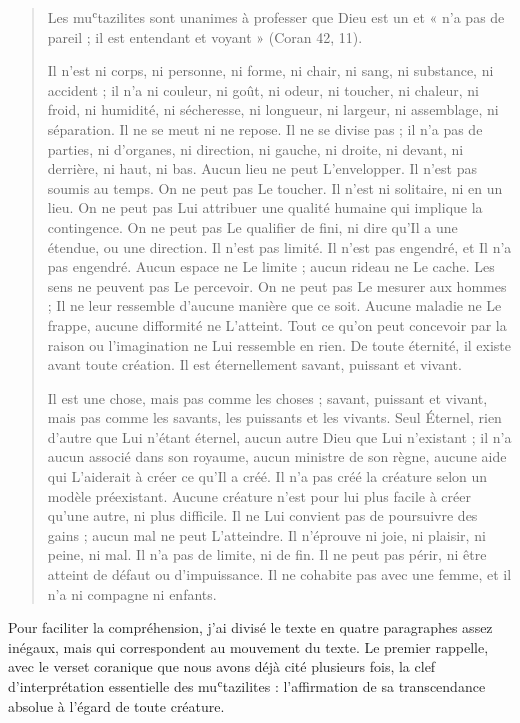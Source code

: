  \begin{quote}
     Les muʿtazilites sont unanimes à professer que Dieu est un et « n'a pas
de pareil ; il est entendant et voyant » (Coran 42, 11).

Il n'est ni corps, ni personne, ni forme, ni chair, ni sang, ni
substance, ni accident ; il n'a ni couleur, ni goût, ni odeur, ni
toucher, ni chaleur, ni froid, ni humidité, ni sécheresse, ni longueur,
ni largeur, ni assemblage, ni séparation. Il ne se meut ni ne repose. Il
ne se divise pas ; il n'a pas de parties, ni d'organes, ni direction, ni
gauche, ni droite, ni devant, ni derrière, ni haut, ni bas. Aucun lieu
ne peut L'envelopper. Il n'est pas soumis au temps. On ne peut pas Le
toucher. Il n'est ni solitaire, ni en un lieu. On ne peut pas Lui
attribuer une qualité humaine qui implique la contingence. On ne peut
pas Le qualifier de fini, ni dire qu'Il a une étendue, ou une direction.
Il n'est pas limité. Il n'est pas engendré, et Il n'a pas engendré.
Aucun espace ne Le limite ; aucun rideau ne Le cache. Les sens ne
peuvent pas Le percevoir. On ne peut pas Le mesurer aux hommes ; Il ne
leur ressemble d'aucune manière que ce soit. Aucune maladie ne Le
frappe, aucune difformité ne L'atteint. Tout ce qu'on peut concevoir par
la raison ou l'imagination ne Lui ressemble en rien. De toute éternité,
il existe avant toute création. Il est éternellement savant, puissant et
vivant.


Il est une chose, mais pas comme les choses ; savant, puissant et
vivant, mais pas comme
les savants, les puissants et les vivants. Seul Éternel, rien d'autre
que Lui n'étant éternel, aucun autre
Dieu que Lui n'existant ; il n'a aucun associé dans son royaume, aucun
ministre de son règne, aucune aide qui L'aiderait à créer ce qu'Il a
créé. Il n'a pas créé la créature selon un modèle préexistant. Aucune
créature n'est pour lui plus facile à créer qu'une autre, ni plus
difficile. Il ne Lui convient pas de poursuivre des gains ; aucun mal ne
peut L'atteindre. Il n'éprouve ni joie, ni plaisir, ni peine, ni mal. Il
n'a pas de limite, ni de fin. Il ne peut pas périr, ni être atteint de
défaut ou d'impuissance. Il ne cohabite pas avec une femme, et il n'a ni
compagne ni enfants.
 \end{quote}


Pour faciliter la compréhension, j'ai divisé le texte en quatre
paragraphes assez inégaux, mais qui correspondent au mouvement du texte.
Le premier rappelle, avec le verset coranique que nous avons déjà cité
plusieurs fois, la clef d'interprétation essentielle des muʿtazilites :
l'affirmation de sa transcendance absolue à l'égard de toute créature.

